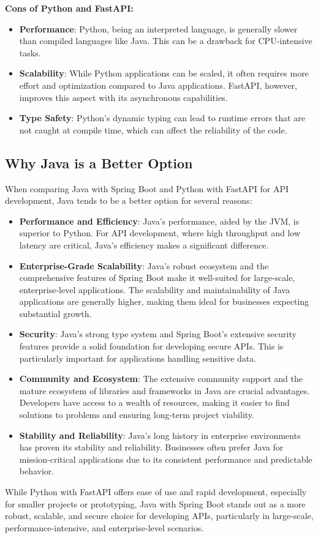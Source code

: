 \textbf{Cons of Python and FastAPI:}
\begin{itemize}
    \item \textbf{Performance}: Python, being an interpreted language, is generally slower than compiled languages like Java. This can be a drawback for CPU-intensive tasks.
    \item \textbf{Scalability}: While Python applications can be scaled, it often requires more effort and optimization compared to Java applications. FastAPI, however, improves this aspect with its asynchronous capabilities.
    \item \textbf{Type Safety}: Python's dynamic typing can lead to runtime errors that are not caught at compile time, which can affect the reliability of the code.
\end{itemize}

\subsection{Why Java is a Better Option}

When comparing Java with Spring Boot and Python with FastAPI for API development, Java tends to be a better option for several reasons:

\begin{itemize}
    \item \textbf{Performance and Efficiency}: Java's performance, aided by the JVM, is superior to Python. For API development, where high throughput and low latency are critical, Java's efficiency makes a significant difference.
    \item \textbf{Enterprise-Grade Scalability}: Java's robust ecosystem and the comprehensive features of Spring Boot make it well-suited for large-scale, enterprise-level applications. The scalability and maintainability of Java applications are generally higher, making them ideal for businesses expecting substantial growth.
    \item \textbf{Security}: Java's strong type system and Spring Boot's extensive security features provide a solid foundation for developing secure APIs. This is particularly important for applications handling sensitive data.
    \item \textbf{Community and Ecosystem}: The extensive community support and the mature ecosystem of libraries and frameworks in Java are crucial advantages. Developers have access to a wealth of resources, making it easier to find solutions to problems and ensuring long-term project viability.
    \item \textbf{Stability and Reliability}: Java's long history in enterprise environments has proven its stability and reliability. Businesses often prefer Java for mission-critical applications due to its consistent performance and predictable behavior.
\end{itemize}

While Python with FastAPI offers ease of use and rapid development, especially for smaller projects or prototyping, Java with Spring Boot stands out as a more robust, scalable, and secure choice for developing APIs, particularly in large-scale, performance-intensive, and enterprise-level scenarios.



